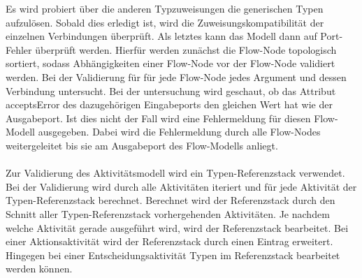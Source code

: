     Es wird probiert über die anderen Typzuweisungen die generischen Typen aufzulösen. 
    Sobald dies erledigt ist, wird die Zuweisungskompatibilität der einzelnen Verbindungen überprüft. 
    Als letztes kann das Modell dann auf Port-Fehler überprüft werden. 
    Hierfür werden zunächst die Flow-Node topologisch sortiert, sodass Abhängigkeiten einer Flow-Node vor der Flow-Node validiert werden. 
    Bei der Validierung für für jede Flow-Node jedes Argument und dessen Verbindung untersucht. 
    Bei der untersuchung wird geschaut, ob das Attribut acceptsError des dazugehörigen Eingabeports den gleichen Wert hat wie der Ausgabeport. 
    Ist dies nicht der Fall wird eine Fehlermeldung für diesen Flow-Modell ausgegeben. 
    Dabei wird die Fehlermeldung durch alle Flow-Nodes weitergeleitet bis sie am Ausgabeport des Flow-Modells anliegt.\\
    \\
    Zur Validierung des Aktivitätsmodell wird ein Typen-Referenzstack verwendet.
    Bei der Validierung wird durch alle Aktivitäten iteriert und für jede Aktivität der Typen-Referenzstack berechnet.
    Berechnet wird der Referenzstack durch den Schnitt aller Typen-Referenzstack vorhergehenden Aktivitäten.
    Je nachdem welche Aktivität gerade ausgeführt wird, wird der Referenzstack bearbeitet.
    Bei einer Aktionsaktivität wird der Referenzstack durch einen Eintrag erweitert.
    Hingegen bei einer Entscheidungsaktivität Typen im Referenzstack bearbeitet werden können.

